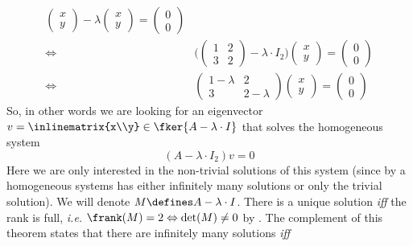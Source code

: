 \begin{exm}
\begin{align*}
\begin{pmatrix}
			x \\ y
		\end{pmatrix}-\lambda\begin{pmatrix}
			x \\ y
		\end{pmatrix}=\begin{pmatrix}
			0 \\ 0
		\end{pmatrix} \\
		\Leftrightarrow
		 & \Bigg(\begin{pmatrix}
			1 & 2 \\
			3 & 2
		\end{pmatrix}-\lambda\cdot I_2\Bigg)\begin{pmatrix}
			x \\ y
		\end{pmatrix}=\begin{pmatrix}
			0 \\ 0
		\end{pmatrix}      \\
		\Leftrightarrow
		 & \begin{pmatrix}
			1-\lambda & 2         \\
			3         & 2-\lambda
		\end{pmatrix}\begin{pmatrix}
			x \\ y
		\end{pmatrix}=\begin{pmatrix}
			0 \\ 0
		\end{pmatrix}
	\end{align*}
	So, in other words we are looking for an eigenvector
	$v=\inlinematrix{x\\y}\in\fker{A-\lambda\cdot I}$
	that solves the homogeneous system
	\begin{equation}\label{eq-homogeneous-system-eigenvectors}
		(A-\lambda\cdot I_2)v=0
	\end{equation}
	Here we are only interested in the non-trivial solutions of this system (since
	by  a homogeneous systems has either
	infinitely many solutions or only the trivial solution). We will denote
	$M\defines A-\lambda\cdot I$. There is a unique solution \textit{iff} the rank
	is full, \textit{i.e.} $\frank(M)=2 \Leftrightarrow \det(M)\neq0$ by
	. The complement of this theorem
	states that there are infinitely many solutions \textit{iff}
	\begin{align*}

\end{align*}
\end{exm}
